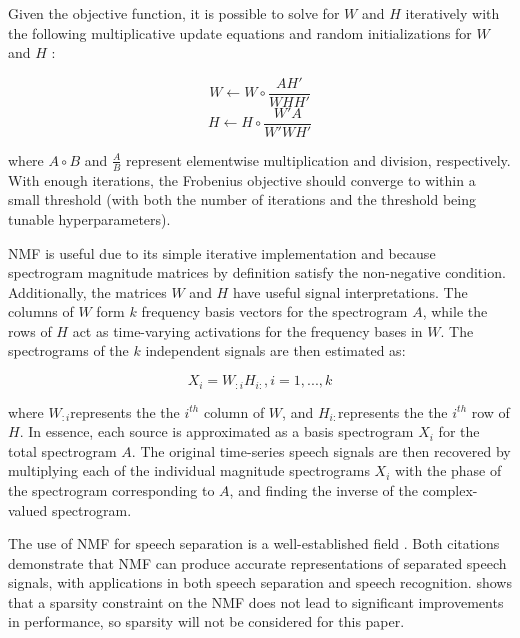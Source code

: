 \documentclass[12pt,chapterheads]{ucsd}
\begin{document}
Given the objective function, it is possible to solve for $W$ and $H$ iteratively with the following multiplicative update equations and random initializations for $W$ and $H$ \cite{Lee00algorithmsfor}:

\begin{equation}
W \leftarrow W \circ \frac{AH'}{WHH'}
\end{equation}
\begin{equation}
H \leftarrow H \circ \frac{W'A}{W'WH'}
\end{equation}

\noindent where $A \circ B$ and $\frac{A}{B}$ represent elementwise multiplication and division, respectively. With enough iterations, the Frobenius objective should converge to within a small threshold (with both the number of iterations and the threshold being tunable hyperparameters).

NMF is useful due to its simple iterative implementation and because spectrogram magnitude matrices by definition satisfy the non-negative condition.  Additionally, the matrices $W$ and $H$ have useful signal interpretations. The columns of $W$ form $k$ frequency basis vectors for the spectrogram $A$, while the rows of $H$ act as time-varying activations for the frequency bases in $W$. The spectrograms of the $k$ independent signals are then estimated as:

\begin{equation}
X_i = W_{:i}H_{i:}, i=1,...,k
\end{equation}

\noindent where $W_{:i} $represents the the $i^{th}$ column of $W$, and $H_{i:} $represents the the $i^{th}$ row of $H$. In essence, each source is approximated as a basis spectrogram $X_i$ for the total spectrogram $A$. The original time-series speech signals are then recovered by multiplying each of the individual magnitude spectrograms $X_i$ with the phase of the spectrogram corresponding to $A$, and finding the inverse of the complex-valued spectrogram.

The use of NMF for speech separation is a well-established field \cite{Schmidt_Olsson_2006}\cite{Virtanen_2007}. Both citations demonstrate that NMF can produce accurate representations of separated speech signals, with applications in both speech separation and speech recognition. \cite{Virtanen_2007} shows that a sparsity constraint on the NMF does not lead to significant improvements in performance, so sparsity will not be considered for this paper.
\end{document}
